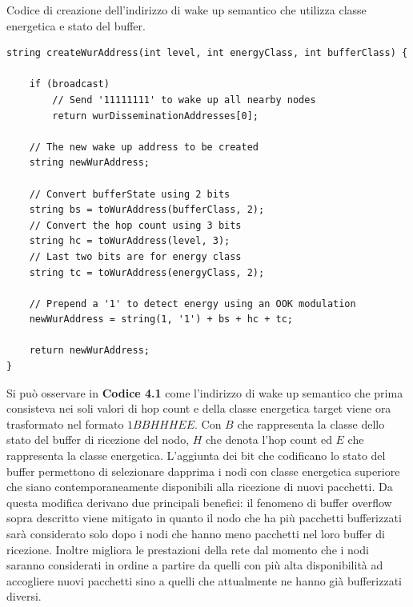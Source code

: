 \documentclass[binding=0.6cm,TFA]{sapthesis}
\begin{document}
\begin{listing}[h]
    \caption{Codice di creazione dell'indirizzo di wake up semantico che utilizza classe energetica e stato del buffer.}
    \begin{verbatim}
string createWurAddress(int level, int energyClass, int bufferClass) {

    if (broadcast)
        // Send '11111111' to wake up all nearby nodes
        return wurDisseminationAddresses[0];

    // The new wake up address to be created
    string newWurAddress;

    // Convert bufferState using 2 bits
    string bs = toWurAddress(bufferClass, 2);
    // Convert the hop count using 3 bits
    string hc = toWurAddress(level, 3);
    // Last two bits are for energy class
    string tc = toWurAddress(energyClass, 2);

    // Prepend a '1' to detect energy using an OOK modulation
    newWurAddress = string(1, '1') + bs + hc + tc;

    return newWurAddress;
}

    \end{verbatim}
\end{listing}

Si può osservare in \textbf{Codice 4.1} come l'indirizzo di wake up semantico che prima consisteva nei soli valori di hop count e della classe energetica target
viene ora trasformato nel formato $1BBHHHEE$. Con $B$ che rappresenta la classe dello stato del buffer di ricezione del nodo, $H$ che denota l'hop count ed $E$ che
rappresenta la classe energetica. L'aggiunta dei bit che codificano lo stato del buffer permettono di selezionare dapprima i nodi con classe energetica
superiore che siano contemporaneamente disponibili alla ricezione di nuovi pacchetti. Da questa modifica derivano due principali benefici: il fenomeno
di buffer overflow sopra descritto viene mitigato in quanto il nodo che ha più pacchetti bufferizzati sarà considerato solo dopo i nodi che hanno meno
pacchetti nel loro buffer di ricezione. Inoltre migliora le prestazioni della rete dal momento che i nodi saranno considerati in ordine a partire da quelli
con più alta disponibilità ad accogliere nuovi pacchetti sino a quelli che attualmente ne hanno già bufferizzati diversi.\\
\end{document}
